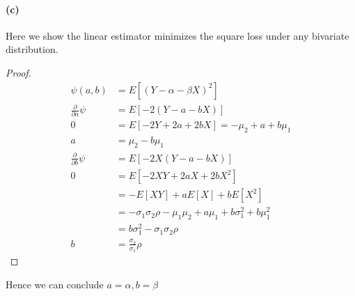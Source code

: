 \documentclass[11pt, letterpaper]{article}
\begin{document}
\paragraph{(c)}
Here we show the linear estimator minimizes the square loss under any bivariate distribution.
\begin{proof}\begin{align*}
    \psi(a, b) &= E[(Y - \alpha - \beta X)^2] \\
    \frac{\partial}{\partial a} \psi &= E[-2(Y-a-bX)] \\
        0 &= E[-2Y +2a +2bX] = -\mu_2 + a + b\mu_1 \\
        a &= \mu_2 - b\mu_1 \\
    \frac{\partial}{\partial b} \psi &= E[-2X(Y-a-bX)] \\
        0 &= E[-2XY + 2aX + 2bX^2] \\
          &= -E[XY] + aE[X] + bE[X^2] \\
          &= -\sigma_1\sigma_2 \rho - \mu_1\mu_2 + a \mu_1 + b\sigma_1^2 + b\mu_1^2 \\
          &= b\sigma_1^2 - \sigma_1\sigma_2 \rho \\
        b &= \frac{\sigma_2}{\sigma_1} \rho
\end{align*}\end{proof}
Hence we can conclude $a = \alpha, b = \beta$
\end{document}

